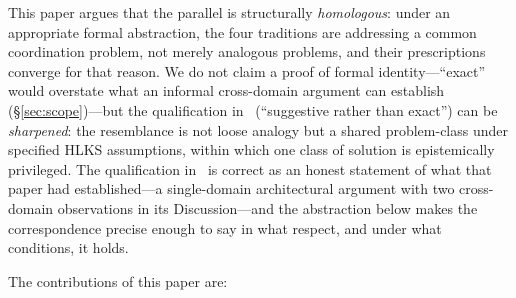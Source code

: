 \documentclass[11pt]{article}
\theoremstyle{definition}
\theoremstyle{plain}
\theoremstyle{plain}
\begin{document}
This paper argues that the parallel is structurally \emph{homologous}: under an
appropriate formal abstraction, the four traditions are addressing a common
coordination problem, not merely analogous problems, and their prescriptions
converge for that reason. We do not claim a proof of formal identity---``exact''
would overstate what an informal cross-domain argument can establish
(\S\ref{sec:scope})---but the qualification in~\cite{nicholson2026} (``suggestive
rather than exact'') can be \emph{sharpened}: the resemblance is not loose analogy
but a shared problem-class under specified HLKS assumptions, within which one class
of solution is epistemically privileged. The qualification in~\cite{nicholson2026}
is correct as an honest statement of what that paper had established---a
single-domain architectural argument with two cross-domain observations in its
Discussion---and the abstraction below makes the correspondence precise enough to
say in what respect, and under what conditions, it holds.

The contributions of this paper are:
\end{document}
